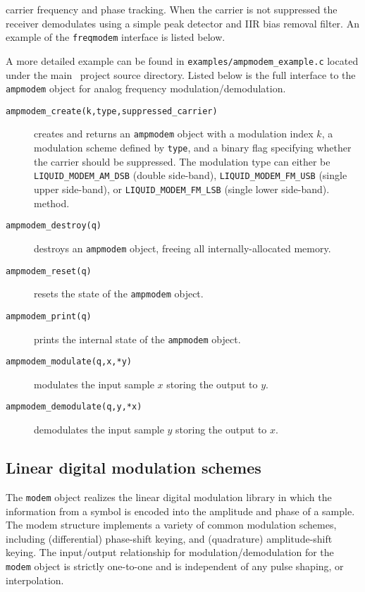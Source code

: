 carrier frequency and phase tracking.
When the carrier is not suppressed the receiver demodulates using a
simple peak detector and IIR bias removal filter.
%
An example of the {\tt freqmodem} interface is listed below.
%

%
A more detailed example can be found in
{\tt examples/ampmodem\_example.c}
located under the main \liquid\ project source directory.
Listed below is the full interface to the {\tt ampmodem} object for
analog frequency modulation/demodulation.
%
\begin{description}
\item[{\tt ampmodem\_create(k,type,suppressed\_carrier)}]
    creates and returns an {\tt ampmodem} object with a modulation
    index $k$,
    a modulation scheme defined by {\tt type},
    and a binary flag specifying whether the carrier should be
    suppressed.
    The modulation type can either be
    {\tt LIQUID\_MODEM\_AM\_DSB} (double side-band),
    {\tt LIQUID\_MODEM\_FM\_USB} (single upper side-band), or
    {\tt LIQUID\_MODEM\_FM\_LSB} (single lower side-band).
    method.
\item[{\tt ampmodem\_destroy(q)}]
    destroys an {\tt ampmodem} object, freeing all internally-allocated
    memory.
\item[{\tt ampmodem\_reset(q)}]
    resets the state of the {\tt ampmodem} object.
\item[{\tt ampmodem\_print(q)}]
    prints the internal state of the {\tt ampmodem} object.
\item[{\tt ampmodem\_modulate(q,x,*y)}]
    modulates the input sample $x$ storing the output to $y$.
\item[{\tt ampmodem\_demodulate(q,y,*x)}]
    demodulates the input sample $y$ storing the output to $x$.
\end{description}



%
%

\subsection{Linear digital modulation schemes}
\label{module:modem:digital}
The {\tt modem} object realizes the linear digital modulation library in which
the information from a symbol is encoded into the amplitude and phase of a
sample.
The modem structure implements a variety of common modulation schemes,
including (differential) phase-shift keying, and (quadrature) amplitude-shift
keying.
The input/output relationship for modulation/demodulation for the {\tt modem}
object is
strictly one-to-one and is independent of any pulse shaping, or interpolation.

